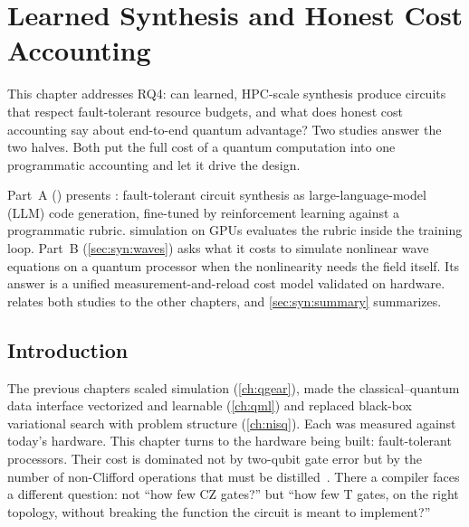 \chapter{Learned Synthesis and Honest Cost Accounting}\label{ch:synthesis}

This chapter addresses RQ4: can learned, HPC-scale synthesis produce circuits that respect fault-tolerant resource budgets, and what does honest cost accounting say about end-to-end quantum advantage? Two studies answer the two halves. Both put the full cost of a quantum computation into one programmatic accounting and let it drive the design.

Part~A () presents \rubriq{}: fault-tolerant circuit synthesis as large-language-model (LLM) code generation, fine-tuned by reinforcement learning against a programmatic rubric. \cudaq{} simulation on GPUs evaluates the rubric inside the training loop. Part~B (\cref{sec:syn:waves}) asks what it costs to simulate nonlinear wave equations on a quantum processor when the nonlinearity needs the field itself. Its answer is a unified measurement-and-reload cost model validated on hardware.  relates both studies to the other chapters, and \cref{sec:syn:summary} summarizes.

\section{Introduction}\label{sec:syn:intro}

The previous chapters scaled simulation (\cref{ch:qgear}), made the classical--quantum data interface vectorized and learnable (\cref{ch:qml}) and replaced black-box variational search with problem structure (\cref{ch:nisq}). Each was measured against today's hardware. This chapter turns to the hardware being built: fault-tolerant processors. Their cost is dominated not by two-qubit gate error but by the number of non-Clifford operations that must be distilled~\cite{bravyi2005magic,fowler2012surfacecodes}. There a compiler faces a different question: not ``how few CZ gates?'' but ``how few T gates, on the right topology, without breaking the function the circuit is meant to implement?''


